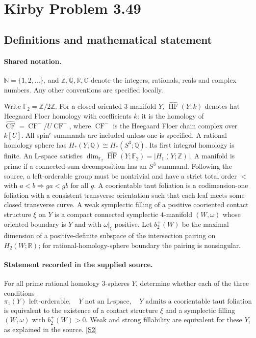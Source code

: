 \documentclass[11pt]{article}
\newcommand{\sref}[2]{\hyperlink{source:#1:#2}{[S#2]}}
\begin{document}
\section{Kirby Problem 3.49}\label{statement}

\subsection{Definitions and mathematical statement}

\paragraph{Shared notation.}$\mathbb N=\{1,2,\ldots\}$, and $\mathbb Z,\mathbb Q,\mathbb R,\mathbb C$ denote the integers, rationals, reals and complex numbers. Any other conventions are specified locally.


Write $\mathbb F_2=\mathbb Z/2\mathbb Z$. For a closed oriented $3$-manifold $Y$, $\widehat{\operatorname{HF}}(Y;k)$ denotes hat Heegaard Floer homology with coefficients $k$: it is the homology of $\widehat{\operatorname{CF}}=\operatorname{CF}^-/U\operatorname{CF}^-$, where $\operatorname{CF}^-$ is the Heegaard Floer chain complex over $k[U]$. All spin$^c$ summands are included unless one is specified. A rational homology sphere has $H_*(Y;\mathbb Q)\cong H_*(S^3;\mathbb Q)$. Its first integral homology is finite. An L-space satisfies $\dim_{\mathbb F_2}\widehat{\operatorname{HF}}(Y;\mathbb F_2)=|H_1(Y;\mathbb Z)|$. A manifold is prime if a connected-sum decomposition has an $S^3$ summand. Following the source, a left-orderable group must be nontrivial and have a strict total order $<$ with $a<b\Rightarrow ga<gb$ for all $g$. A coorientable taut foliation is a codimension-one foliation with a consistent transverse orientation such that each leaf meets some closed transverse curve. A weak symplectic filling of a positive cooriented contact structure $\xi$ on $Y$ is a compact connected symplectic $4$-manifold $(W,\omega)$ whose oriented boundary is $Y$ and with $\omega|_\xi$ positive. Let $b_2^+(W)$ be the maximal dimension of a positive-definite subspace of the intersection pairing on $H_2(W;\mathbb R)$; for rational-homology-sphere boundary the pairing is nonsingular.
\paragraph{Statement recorded in the supplied source.}
For all prime rational homology $3$-spheres $Y$, determine whether each of the three conditions
\[
\pi_1(Y)\text{ left-orderable},\quad Y\text{ not an L-space},\quad
Y\text{ admits a coorientable taut foliation}
\]
is equivalent to the existence of a contact structure $\xi$ and a symplectic filling $(W,\omega)$ with $b_2^+(W)>0$. Weak and strong fillability are equivalent for these $Y$, as explained in the source. \sref{statement}{2}
\end{document}
